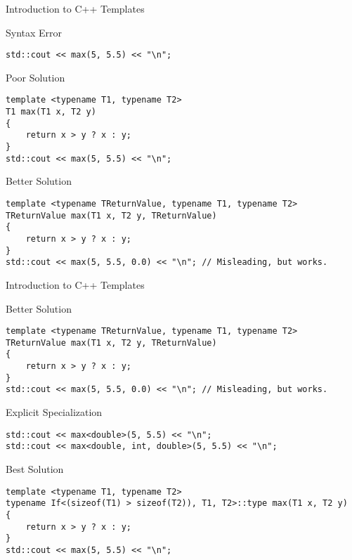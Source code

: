 \documentclass[aspectratio=169]{beamer}
\begin{document}

\begin{frame}[fragile]{Introduction to C++ Templates}

    \scriptsize
    \begin{block}{Syntax Error}
        \begin{verbatim}
std::cout << max(5, 5.5) << "\n";
        \end{verbatim}
    \end{block}

    \begin{block}{Poor Solution}
        \begin{verbatim}
template <typename T1, typename T2>
T1 max(T1 x, T2 y)
{
    return x > y ? x : y;
}
std::cout << max(5, 5.5) << "\n";
        \end{verbatim}
    \end{block}

    \begin{block}{Better Solution}
        \begin{verbatim}
template <typename TReturnValue, typename T1, typename T2>
TReturnValue max(T1 x, T2 y, TReturnValue)
{
    return x > y ? x : y;
}
std::cout << max(5, 5.5, 0.0) << "\n"; // Misleading, but works.
        \end{verbatim}
    \end{block}

\end{frame}


\begin{frame}[fragile]{Introduction to C++ Templates}

    \scriptsize
    \begin{block}{Better Solution}
        \begin{verbatim}
template <typename TReturnValue, typename T1, typename T2>
TReturnValue max(T1 x, T2 y, TReturnValue)
{
    return x > y ? x : y;
}
std::cout << max(5, 5.5, 0.0) << "\n"; // Misleading, but works.
        \end{verbatim}
    \end{block}
    
    \begin{block}{Explicit Specialization}
        \begin{verbatim}
std::cout << max<double>(5, 5.5) << "\n";
std::cout << max<double, int, double>(5, 5.5) << "\n";
        \end{verbatim}
    \end{block}

    \begin{block}{Best Solution}
        \begin{verbatim}
template <typename T1, typename T2>
typename If<(sizeof(T1) > sizeof(T2)), T1, T2>::type max(T1 x, T2 y)
{
    return x > y ? x : y;
}
std::cout << max(5, 5.5) << "\n";
        \end{verbatim}
    \end{block}

\end{frame}
\end{document}
